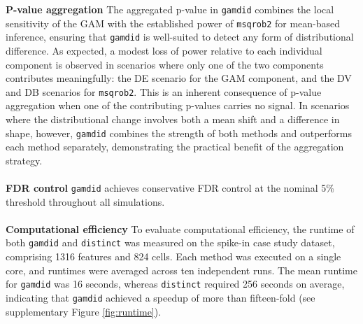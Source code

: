 \textbf{P-value aggregation}
The aggregated p-value in \texttt{gamdid} combines the local sensitivity of the GAM with the established power of \texttt{msqrob2} for mean-based inference, ensuring that \texttt{gamdid} is well-suited to detect any form of distributional difference. As expected, a modest loss of power relative to each individual component is observed in scenarios where only one of the two components contributes meaningfully: the DE scenario for the GAM component, and the DV and DB scenarios for \texttt{msqrob2}. This is an inherent consequence of p-value aggregation when one of the contributing p-values carries no signal. In scenarios where the distributional change involves both a mean shift and a difference in shape, however, \texttt{gamdid} combines the strength of both methods and outperforms each method separately, demonstrating the practical benefit of the aggregation strategy.
\\
\\
\textbf{FDR control}
\texttt{gamdid} achieves conservative FDR control at the nominal 5\% threshold throughout all simulations.
\\
\\
\textbf{Computational efficiency}
To evaluate computational efficiency, the runtime of both \texttt{gamdid} and \texttt{distinct} was measured on the spike-in case study dataset, comprising 1316 features and 824 cells. Each method was executed on a single core, and runtimes were averaged across ten independent runs. The mean runtime for \texttt{gamdid} was 16 seconds, whereas \texttt{distinct} required 256 seconds on average, indicating that \texttt{gamdid} achieved a speedup of more than fifteen-fold (see supplementary Figure \ref{fig:runtime}).


